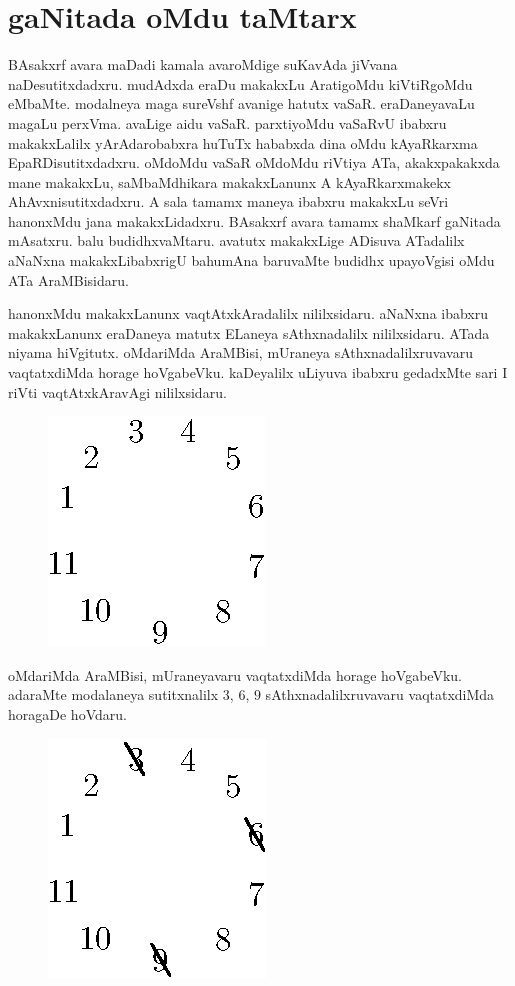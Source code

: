 \chapter{gaNitada oMdu taMtarx}


BAsakxrf avara maDadi kamala avaroMdige suKavAda jiVvana naDesutitxdadxru. mudAdxda eraDu makakxLu AratigoMdu kiVtiRgoMdu eMbaMte. modalneya maga sureVshf avanige hatutx vaSaR. eraDaneyavaLu magaLu perxVma. avaLige aidu vaSaR. parxtiyoMdu vaSaRvU ibabxru makakxLalilx yArAdarobabxra huTuTx hababxda dina oMdu kAyaRkarxma EpaRDisutitxdadxru. oMdoMdu vaSaR oMdoMdu riVtiya ATa, akakxpakakxda mane makakxLu, saMbaMdhikara makakxLanunx A kAyaRkarxmakekx AhAvxnisutitxdadxru. A sala tamamx maneya ibabxru makakxLu seVri hanonxMdu jana makakxLidadxru. BAsakxrf avara tamamx shaMkarf gaNitada mAsatxru. balu budidhxvaMtaru. avatutx makakxLige ADisuva ATadalilx aNaNxna makakxLibabxrigU bahumAna baruvaMte budidhx upayoVgisi oMdu ATa AraMBisidaru.

hanonxMdu makakxLanunx vaqtAtxkAradalilx nililxsidaru. aNaNxna ibabxru makakxLanunx eraDaneya matutx ELaneya sAthxnadalilx nililxsidaru. ATada niyama hiVgitutx. oMdariMda AraMBisi, mUraneya sAthxnadalilxruvavaru vaqtatxdiMda horage hoVgabeVku. kaDeyalilx uLiyuva ibabxru gedadxMte sari I riVti vaqtAtxkAravAgi nililxsidaru.
\begin{figure}[H]
\centering
\includegraphics{src/figures/fig1.eps}
\end{figure}

oMdariMda AraMBisi, mUraneyavaru vaqtatxdiMda horage hoVgabeVku. adaraMte modalaneya sutitxnalilx $3$, $6$, $9$ sAthxnadalilxruvavaru vaqtatxdiMda horagaDe hoVdaru.
\begin{figure}[H]
\centering
\includegraphics{src/figures/fig2.eps}
\end{figure}

